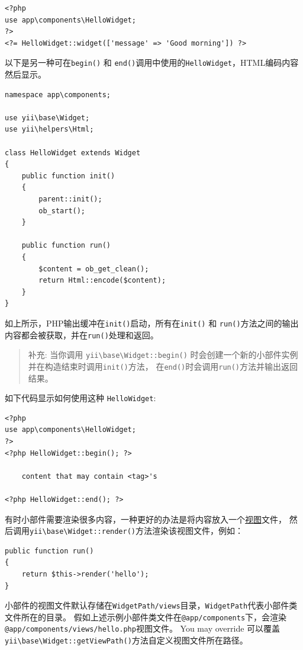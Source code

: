 \lstset{language=php}\begin{lstlisting}
<?php
use app\components\HelloWidget;
?>
<?= HelloWidget::widget(['message' => 'Good morning']) ?>
\end{lstlisting}
以下是另一种可在\lstinline|begin()| 和 \lstinline|end()|调用中使用的\lstinline|HelloWidget|，HTML编码内容然后显示。

\lstset{language=php}\begin{lstlisting}
namespace app\components;

use yii\base\Widget;
use yii\helpers\Html;

class HelloWidget extends Widget
{
    public function init()
    {
        parent::init();
        ob_start();
    }

    public function run()
    {
        $content = ob_get_clean();
        return Html::encode($content);
    }
}
\end{lstlisting}
如上所示，PHP输出缓冲在\lstinline|init()|启动，所有在\lstinline|init()| 和 \lstinline|run()|方法之间的输出内容都会被获取，并在\lstinline|run()|处理和返回。

\begin{quote}补充: 当你调用 \texttt{yii{\allowbreak{}\textbackslash}base{\allowbreak{}\textbackslash}Widget\allowbreak{}::\allowbreak{}begin()} 时会创建一个新的小部件实例并在构造结束时调用\lstinline|init()|方法，
  在\lstinline|end()|时会调用\lstinline|run()|方法并输出返回结果。

\end{quote}
如下代码显示如何使用这种 \lstinline|HelloWidget|:

\lstset{language=php}\begin{lstlisting}
<?php
use app\components\HelloWidget;
?>
<?php HelloWidget::begin(); ?>

    content that may contain <tag>'s

<?php HelloWidget::end(); ?>
\end{lstlisting}
有时小部件需要渲染很多内容，一种更好的办法是将内容放入一个\hyperref[structure-views.md]{视图}文件，
然后调用\texttt{yii{\allowbreak{}\textbackslash}base{\allowbreak{}\textbackslash}Widget\allowbreak{}::\allowbreak{}render()}方法渲染该视图文件，例如：

\lstset{language=php}\begin{lstlisting}
public function run()
{
    return $this->render('hello');
}
\end{lstlisting}
小部件的视图文件默认存储在\lstinline|WidgetPath/views|目录，\lstinline|WidgetPath|代表小部件类文件所在的目录。
假如上述示例小部件类文件在\lstinline|@app/components|下，会渲染\lstinline|@app/components/views/hello.php|视图文件。 You may override
可以覆盖\texttt{yii{\allowbreak{}\textbackslash}base{\allowbreak{}\textbackslash}Widget\allowbreak{}::\allowbreak{}getViewPath()}方法自定义视图文件所在路径。

